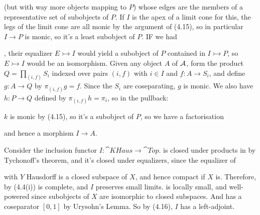 \documentclass{article}
\begin{document}
\begin{enumerate}
        (but with way more objects mapping to $P$) whose edges are the members of a representative set of subobjects of $P$. If $I$ is the apex of a limit cone for this, the legs of the limit cone are all monic by the argument of (4.15), so in particular $I \to P$ is monic, so it's a least subobject of $P$. IF we had , their equalizer $E \rightarrowtail I$ would yield a subobject of $P$ contained in $I \rightarrowtail P$, so $E \rightarrowtail I$ would be an isomorphism. \gap Given any object $A$ of $\mathcal{A}$, form the product $Q = \prod_{(i,f)} S_{i}$ indexed over pairs $(i,f)$ with $i \in I$ and $f:A \to S_{i}$, and define $g: A \to Q$ by $\pi_{(i,f)}g=f$. Since the $S_{i}$ are coseparating, $g$ is monic. We also have $h :  P \to Q$ defined by $\pi_{(i,f)}h=\pi_{i}$, so in the pullback: \begin{center} 
    \end{center}
    $k$ is monic by (4.15), so it's a subobject of $P$, so we have a factorisation \begin{center}
    \end{center}
    and hence a morphism $I \to A$.
\end{enumerate}
\endproof
\begin{ex}
    Consider the inclusion functor $I: \cat{KHaus} \to \cat{Top}.$  is closed under products in  by Tychonoff's theorem, and it's closed under equalizers, since the equalizer of 
        with $Y$ Hausdorff is a closed subspace of $X$, and hence compact if $X$ is. Therefore, by (4.4(i))  is complete, and $I$ preserves small limits.\gap {} is locally small, and well-powered since subobjects of $X$ are isomorphic to closed subspaces. And  has a coseparator $[0,1]$ by Urysohn's Lemma. So by (4.16), $I$ has a left-adjoint.
\end{ex}
\end{document}

